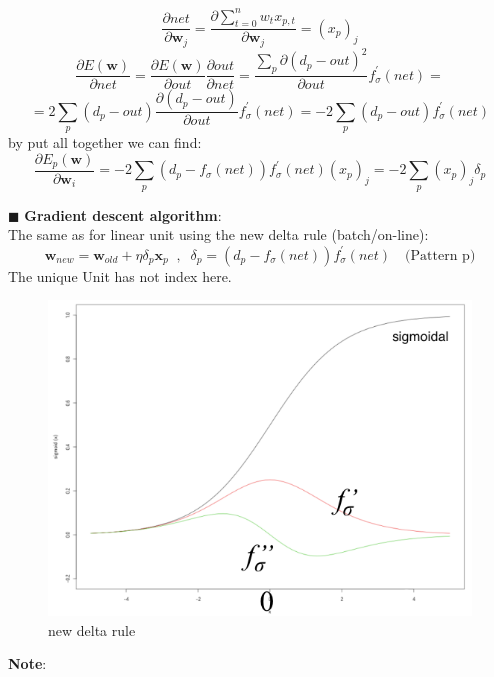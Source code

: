 \documentclass[../main.tex]{subfiles}
\begin{document}
$$  \frac{\partial net}{\partial \mathbf{w}_j} = \frac{\partial \sum_{t = 0}^{n} w_t x_{p,t}}{\partial \mathbf{w}_j}  = (x_p)_j$$
$$  \frac{\partial E(\mathbf{w})}{\partial net} = \frac{\partial E(\mathbf{w})}{\partial out} \frac{\partial out}{\partial net} = \frac{ \sum_{p}^{} \partial(d_p - out)^2}{\partial out} f^{'}_\sigma(net) =$$ 
$$= 2\sum_{p}^{}(d_p - out) \frac{\partial(d_p - out)}{\partial out}  f^{'}_\sigma(net) = -2\sum_{p}^{}(d_p - out)f^{'}_\sigma(net)$$
by put all together we can find:
$$\frac{\partial E_p(\mathbf{w})}{\partial\mathbf{w}_i} = -2\sum_{p}^{}(d_p - f_\sigma(net))f^{'}_\sigma(net)(x_p)_j = -2\sum_{p}^{}(x_p)_j \delta_p$$ 

\noindent$\blacksquare$  \textbf{Gradient descent algorithm}:\\
The same as for linear unit using the new delta rule (batch/on-line):
$$ \mathbf{w}_{new} = \mathbf{w}_{old} + \eta\delta_p \mathbf{x}_p\;\; , \;\; \delta_p = (d_p - f_\sigma(net))f^{'}_\sigma(net) \quad \text{(Pattern p)}$$
The unique Unit has not index here.
\begin{figure}[H]
    \centering
    \includegraphics[scale = 0.3]{lectures/4_neural_networks/4_new_delat_rule.png}
    \caption{new delta rule}
    \label{fig:4_new_delat_rule}
\end{figure}
\textbf{Note}:
\end{document}
